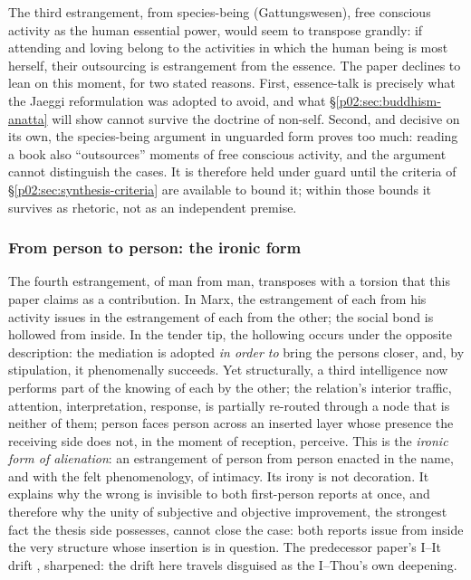 \documentclass[11pt,a4paper]{article}
\newcommand{\term}[1]{\textit{\textcolor{pinkitalic}{#1}}}
\begin{document}
The third estrangement, from species-being (Gattungswesen), free conscious activity as the human essential power, would seem to transpose grandly: if attending and loving belong to the activities in which the human being is most herself, their outsourcing is estrangement from the essence. The paper declines to lean on this moment, for two stated reasons. First, essence-talk is precisely what the Jaeggi reformulation was adopted to avoid, and what \S\ref{p02:sec:buddhism-anatta} will show cannot survive the doctrine of non-self. Second, and decisive on its own, the species-being argument in unguarded form proves too much: reading a book also ``outsources'' moments of free conscious activity, and the argument cannot distinguish the cases. It is therefore held under guard until the criteria of \S\ref{p02:sec:synthesis-criteria} are available to bound it; within those bounds it survives as rhetoric, not as an independent premise.

\subsubsection{From person to person: the ironic form}
\label{p02:sec:marx-person}

The fourth estrangement, of man from man, transposes with a torsion that this paper claims as a contribution. In Marx, the estrangement of each from his activity issues in the estrangement of each from the other; the social bond is hollowed from inside. In the tender tip, the hollowing occurs under the opposite description: the mediation is adopted \emph{in order to} bring the persons closer, and, by stipulation, it phenomenally succeeds. Yet structurally, a third intelligence now performs part of the knowing of each by the other; the relation's interior traffic, attention, interpretation, response, is partially re-routed through a node that is neither of them; person faces person across an inserted layer whose presence the receiving side does not, in the moment of reception, perceive. This is the \term{ironic form of alienation}: an estrangement of person from person enacted in the name, and with the felt phenomenology, of intimacy. Its irony is not decoration. It explains why the wrong is invisible to both first-person reports at once, and therefore why the unity of subjective and objective improvement, the strongest fact the thesis side possesses, cannot close the case: both reports issue from inside the very structure whose insertion is in question. The predecessor paper's I--It drift \parencite[\S 8.1.3]{huang2025toward}, sharpened: the drift here travels disguised as the I--Thou's own deepening.
\end{document}
